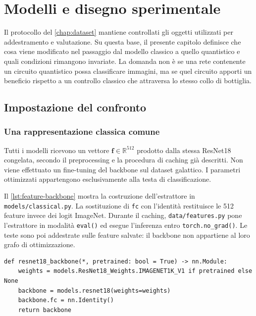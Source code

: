 \chapter{Modelli e disegno sperimentale}
\label{chap:modelli}

Il protocollo del \cref{chap:dataset} mantiene controllati gli oggetti
utilizzati per addestramento e valutazione. Su questa base, il presente
capitolo definisce che cosa viene modificato nel passaggio dal modello
classico a quello quantistico e quali condizioni rimangono invariate.
La domanda non è se una rete contenente un circuito quantistico possa
classificare immagini, ma se quel circuito apporti un beneficio rispetto
a un controllo classico che attraversa lo stesso collo di bottiglia.

\section{Impostazione del confronto}
\label{sec:disegno-confronto}

\subsection{Una rappresentazione classica comune}

Tutti i modelli ricevono un vettore \(\boldsymbol{f}\in\mathbb{R}^{512}\)
prodotto dalla stessa ResNet18 congelata, secondo il preprocessing e la
procedura di caching già descritti. Non viene effettuato un fine-tuning
del backbone sul dataset galattico. I parametri ottimizzati appartengono
esclusivamente alla testa di classificazione.

Il \cref{lst:feature-backbone} mostra la costruzione dell'estrattore
in \texttt{models/classical.py}. La sostituzione di \texttt{fc}
con l'identità restituisce le 512 feature invece dei logit ImageNet.
Durante il caching, \texttt{data/features.py} pone l'estrattore in
modalità \texttt{eval()} ed esegue l'inferenza entro
\texttt{torch.no\_grad()}. Le teste sono poi addestrate sulle feature
salvate: il backbone non appartiene al loro grafo di ottimizzazione.

\begin{code}
\begin{verbatim}
def resnet18_backbone(*, pretrained: bool = True) -> nn.Module:
    weights = models.ResNet18_Weights.IMAGENET1K_V1 if pretrained else None
    backbone = models.resnet18(weights=weights)
    backbone.fc = nn.Identity()
    return backbone
\end{verbatim}
\caption{Costruzione della ResNet18 usata per il caching delle feature;
negli esperimenti viene selezionato \texttt{pretrained=True}.}
\label{lst:feature-backbone}
\end{code}

